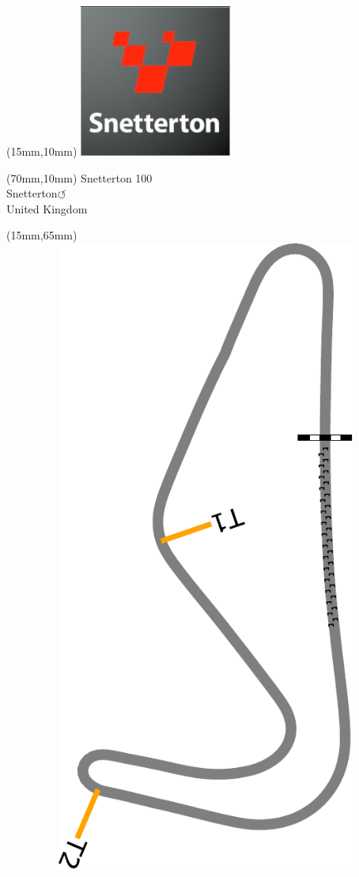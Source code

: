 \null\newpage
\begin{textblock*}{50mm}(15mm,10mm)%
\includegraphics[width=50mm]{LG/2015-05-20_00095.png}
\end{textblock*}
\begin{textblock*}{130mm}(70mm,10mm)%
{\fontsize{20}{20}\selectfont Snetterton 100\\}
{\fontsize{16}{16}\selectfont Snetterton\hfill \Large$\circlearrowleft$\\}
{\fontsize{12}{12}\selectfont United Kingdom\\}
\end{textblock*}
\begin{textblock*}{185mm}(15mm,65mm)%
\centering
\mbox{\includegraphics[width=185mm,height=210mm,keepaspectratio]{PT/SN100.pdf}}
\end{textblock*}
